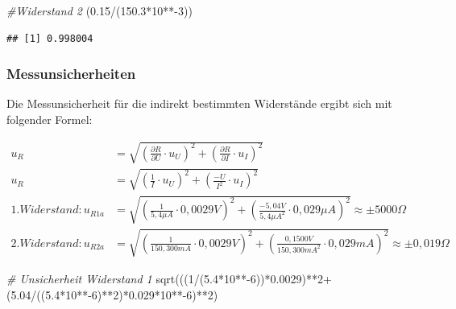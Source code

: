 \documentclass[
  9pt,
]{article}
\newenvironment{Shaded}{\begin{snugshade}}{\end{snugshade}}
\newcommand{\CommentTok}[1]{\textcolor[rgb]{0.56,0.35,0.01}{\textit{#1}}}
\newcommand{\DecValTok}[1]{\textcolor[rgb]{0.00,0.00,0.81}{#1}}
\newcommand{\FloatTok}[1]{\textcolor[rgb]{0.00,0.00,0.81}{#1}}
\newcommand{\FunctionTok}[1]{\textcolor[rgb]{0.00,0.00,0.00}{#1}}
\newcommand{\NormalTok}[1]{#1}
\newcommand{\SpecialCharTok}[1]{\textcolor[rgb]{0.00,0.00,0.00}{#1}}
\begin{document}
\begin{Shaded}
\begin{Highlighting}[]
\CommentTok{\#Widerstand 2}
\NormalTok{(}\FloatTok{0.15}\SpecialCharTok{/}\NormalTok{(}\FloatTok{150.3}\SpecialCharTok{*}\DecValTok{10}\SpecialCharTok{**{-}}\DecValTok{3}\NormalTok{))}
\end{Highlighting}
\end{Shaded}

\begin{verbatim}
## [1] 0.998004
\end{verbatim}

\hypertarget{messunsicherheiten}{%
\subsubsection{Messunsicherheiten}\label{messunsicherheiten}}

Die Messunsicherheit für die indirekt bestimmten Widerstände ergibt sich
mit folgender Formel:

\begin {equation*}
\begin{split}
u_R &= \sqrt{\left (\frac{\partial R}{\partial U} \cdot u_U\right )^2 + \left (\frac{\partial R}{\partial I} \cdot u_I\right )^2 } \\
u_R &= \sqrt{\left (\frac{1}{I} \cdot u_U\right )^2 + \left (\frac{-U}{I^2} \cdot u_I\right )^2 } \\
1.Widerstand: u_{R1a}&= \sqrt{\left (\frac{1}{5,4\mu A} \cdot 0,0029V\right )^2 + \left (\frac{-5,04V}{5,4\mu A^2} \cdot 0,029 \mu A\right )^2 } \approx \pm 5000\Omega \\
2.Widerstand: u_{R2a}&= \sqrt{\left (\frac{1}{150,300mA} \cdot 0,0029V \right )^2 + \left (\frac{0,1500V}{150,300mA^2} \cdot 0,029mA\right )^2 } \approx \pm 0,019 \Omega
\end{split}
\end{equation*}

\begin{Shaded}
\begin{Highlighting}[]
\CommentTok{\# Unsicherheit Widerstand 1}
\FunctionTok{sqrt}\NormalTok{(((}\DecValTok{1}\SpecialCharTok{/}\NormalTok{(}\FloatTok{5.4}\SpecialCharTok{*}\DecValTok{10}\SpecialCharTok{**{-}}\DecValTok{6}\NormalTok{))}\SpecialCharTok{*}\FloatTok{0.0029}\NormalTok{)}\SpecialCharTok{**}\DecValTok{2}\SpecialCharTok{+}\NormalTok{(}\FloatTok{5.04}\SpecialCharTok{/}\NormalTok{((}\FloatTok{5.4}\SpecialCharTok{*}\DecValTok{10}\SpecialCharTok{**{-}}\DecValTok{6}\NormalTok{)}\SpecialCharTok{**}\DecValTok{2}\NormalTok{)}\SpecialCharTok{*}\FloatTok{0.029}\SpecialCharTok{*}\DecValTok{10}\SpecialCharTok{**{-}}\DecValTok{6}\NormalTok{)}\SpecialCharTok{**}\DecValTok{2}\NormalTok{)}
\end{Highlighting}
\end{Shaded}
\end{document}
